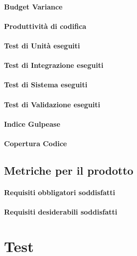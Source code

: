			\paragraph{Budget Variance}
			\paragraph{Produttività di codifica}
			\paragraph{Test di Unità eseguiti}
			\paragraph{Test di Integrazione eseguiti}
			\paragraph{Test di Sistema eseguiti}
			\paragraph{Test di Validazione eseguiti}
			\paragraph{Indice Gulpease}
			\paragraph{Copertura Codice}
	\subsection{Metriche per il prodotto}
		\paragraph{Requisiti obbligatori soddisfatti}
		\paragraph{Requisiti desiderabili soddisfatti}
\newpage
\section{Test}

